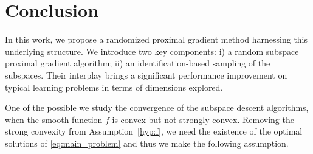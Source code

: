 \section{Conclusion}\label{sec:mor-conclusion}
{In this work, we propose a randomized proximal gradient method harnessing this underlying structure. We introduce two key components: i) a random subspace proximal gradient algorithm; ii) an identification-based sampling of the subspaces. Their interplay brings a significant performance improvement on typical learning problems in terms of dimensions explored.

One of the possible we study the convergence of the subspace descent algorithms, when the smooth function $f$ is convex but not strongly convex. Removing the strong convexity from Assumption~\ref{hyp:f}, we need the existence of the optimal solutions of \eqref{eq:main_problem} and thus we make the following assumption.

}